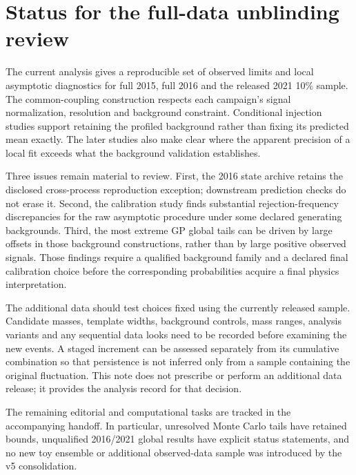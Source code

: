 \section{Status for the full-data unblinding review}
\label{sec:v5-review}

The current analysis gives a reproducible set of observed limits and local
asymptotic diagnostics for full 2015, full 2016 and the released 2021 10\%
sample. The common-coupling construction respects each campaign's signal
normalization, resolution and background constraint. Conditional injection
studies support retaining the profiled background rather than fixing its
predicted mean exactly. The later studies also make clear where the apparent
precision of a local fit exceeds what the background validation establishes.

Three issues remain material to review. First, the 2016 state archive retains
the disclosed cross-process reproduction exception; downstream prediction
checks do not erase it. Second, the calibration study finds substantial
rejection-frequency discrepancies for the raw asymptotic procedure under some
declared generating backgrounds. Third, the most extreme GP global tails can
be driven by large offsets in those background constructions, rather than by
large positive observed signals. Those findings require a qualified background
family and a declared final calibration choice before the corresponding
probabilities acquire a final physics interpretation.

The additional data should test choices fixed using the currently released
sample. Candidate masses, template widths, background controls, mass ranges,
analysis variants and any sequential data looks need to be recorded before
examining the new events. A staged increment can be assessed separately from
its cumulative combination so that persistence is not inferred only from a
sample containing the original fluctuation. This note does not prescribe or
perform an additional data release; it provides the analysis record for that
decision.

The remaining editorial and computational tasks are tracked in the accompanying
handoff. In particular, unresolved Monte Carlo tails have retained bounds,
unqualified 2016/2021 global results have explicit status statements, and no
new toy ensemble or additional observed-data sample was introduced by the v5
consolidation.
